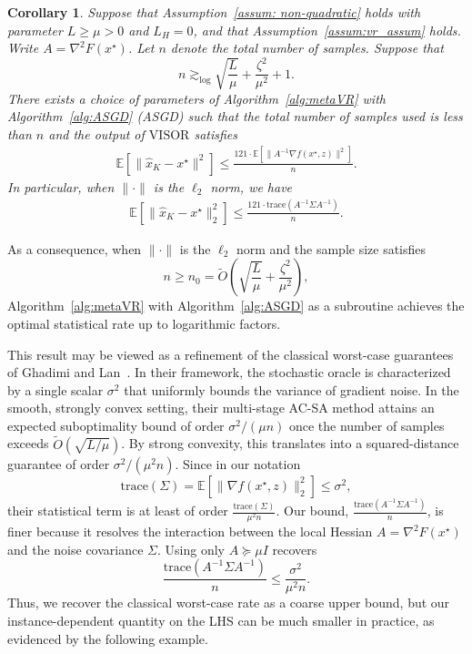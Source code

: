 \documentclass[11pt,twoside]{article}
\numberwithin{equation}{section}
\newcommand{\EE}{\mathbb{E}}
\newcommand{\trace}[1]{\mathrm{trace}\left(#1\right)}
\newcommand{\1}{\mathbf{1}}
\newtheorem{corollary}[theorem]{Corollary}
\theoremstyle{remark}
\theoremstyle{plain}
\newcommand{\liph}{L_H}
\newcommand{\algname}{\mathrm{VISOR}}
\begin{document}
\begin{corollary}\label{cor:complexity_quad_ASGD}
Suppose that  Assumption~\ref{assum: non-quadratic} holds with parameter $L \ge \mu >0$ and $\liph = 0$, and that Assumption~\ref{assum:vr_assum} holds.  Write $A = \nabla^2 F(x^\star)$.  Let $n$ denote the total number of samples. Suppose that 
$$n \gtrsim_{\log} \sqrt{\frac{L}{\mu}} + \frac{\zeta^2}{\mu^2} +1.$$ 
There exists a choice of parameters of Algorithm~\ref{alg:metaVR} with Algorithm~\ref{alg:ASGD} (ASGD) such that the total number of samples used is less than $n$
and the output of $\algname$ satisfies
\begin{align*}
	\EE[\|\widehat x_K - x^\star\|^2] \le \frac{121 \cdot \EE[\|A^{-1} \nabla f(x^\star, z)\|^2]}{n} .
\end{align*}
In particular, when $\|\cdot\|$ is the $\ell_2$ norm, we have 
\begin{align*} 
	\EE[\|\widehat x_K - x^\star\|_2^2] \le   \frac{121 \cdot\trace{A^{-1}\Sigma A^{-1}}}{n} .
\end{align*}
\end{corollary}

As a consequence, when $\|\cdot\|$ is the $\ell_2$ norm and the sample size satisfies
\[
n \ge n_0 = \tilde O\left(\sqrt{\frac{L}{\mu}} + \frac{\zeta^2}{\mu^2}\right),
\]
Algorithm~\ref{alg:metaVR} with Algorithm~\ref{alg:ASGD} as a subroutine achieves the optimal statistical rate up to logarithmic factors.

This result may be viewed as a refinement of the classical worst-case guarantees of Ghadimi and Lan~\cite{ghadimi2013optimal}. In their framework, the stochastic oracle is characterized by a single scalar $\sigma^2$ that uniformly bounds the variance of gradient noise. In the smooth, strongly convex setting, their multi-stage AC-SA method attains an expected suboptimality bound of order $\sigma^2/(\mu n)$ once the number of samples exceeds $\tilde O(\sqrt{L/\mu})$. By strong convexity, this translates into a squared-distance guarantee of order $\sigma^2/(\mu^2 n)$.  Since in our notation
\[
\trace{\Sigma}=\EE\!\left[\|\nabla f(x^\star,z)\|_2^2\right]\le \sigma^2,
\]
their statistical term is at least of order $\frac{\trace{\Sigma}}{\mu^2 n}$. Our bound,
$\frac{\trace{A^{-1}\Sigma A^{-1}}}{n}$, is finer because it resolves the interaction between the local Hessian $A=\nabla^2 F(x^\star)$ and the noise covariance $\Sigma$. Using only $A \succeq \mu I$ recovers
\[
\frac{\trace{A^{-1}\Sigma A^{-1}}}{n} \le \frac{\sigma^2}{\mu^2 n}.
\]
Thus, we recover the classical worst-case rate as a coarse upper bound, but our instance-dependent quantity on the LHS can be much smaller in practice, as evidenced by the following example.
\end{document}

